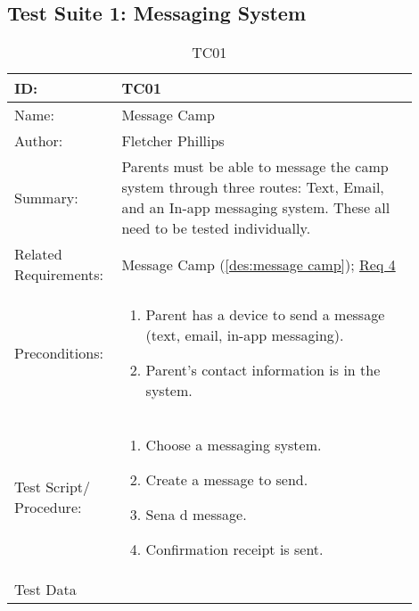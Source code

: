 \documentclass[11pt]{article}
\begin{document}

\clearpage

\subsection*{Test Suite 1: Messaging System}

\begin{table}[H]
\begin{center}
\caption{TC01}
\label{TC01}
\begin{tabular}{p{0.20\linewidth}p{0.70\linewidth}}
	ID: & TC01\\\hline
	Name: & Message Camp \\\hline
	Author: & Fletcher Phillips\\\hline
	Summary: &  Parents must be able to message the camp system through three routes: Text, Email, and an In-app messaging system. These all need to be tested individually.\\\hline
	Related \hspace{5em} Requirements:& Message Camp (\cref{des:message camp}); \hyperlink{Req4}{Req 4} \\\hline
	Preconditions:& \begin{enumerate}[topsep=0pt]
		\item Parent has a device to send a message (text, email, in-app messaging).
		\item Parent's contact information is in the system.
	\end{enumerate}\\\hline
	Test Script/ Procedure: & \begin{enumerate}[topsep=0pt]
		\item Choose a messaging system.
		\item Create a message to send.
		\item Sena d message.
		\item Confirmation receipt is sent.
	\end{enumerate}\\\hline
	Test Data & 
\end{tabular}
\end{center}
\end{table}
\end{document}
